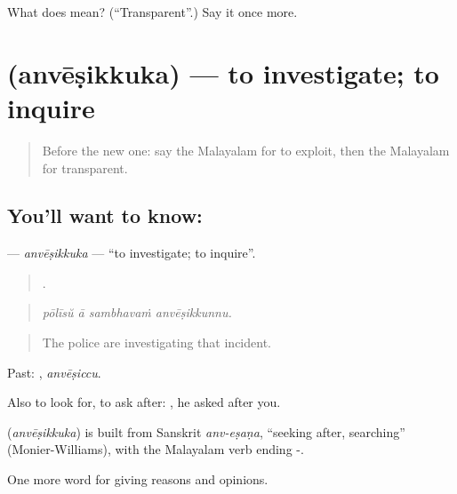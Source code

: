 \begin{tcolorbox}[breakable,colback=teal!4,colframe=teal!35!black,title={Before you move on}]
What does  mean? (\textquotedblleft{}Transparent\textquotedblright{}.) Say it once more.
\end{tcolorbox}
\section[\texorpdfstring{\ml{അന്വേഷിക്കുക} (anvēṣikkuka)}{അന്വേഷിക്കുക (anvēṣikkuka)}]{ (anvēṣikkuka) — to investigate; to inquire}

\label{lesson:ML-C430-anvesikkuka}



\begin{quote}
Before the new one: say the Malayalam for to exploit, then the Malayalam for transparent.
\end{quote}

\subsection*{You'll want to know: }
\textbf{} — \emph{anvēṣikkuka} — \textquotedblleft{}to investigate; to inquire\textquotedblright{}.

\begin{quote}
   .
\end{quote}

\begin{quote}
\emph{pōlīsŭ ā sambhavaṁ anvēṣikkunnu.}
\end{quote}

\begin{quote}
The police are investigating that incident.
\end{quote}

Past: , \emph{anvēṣiccu}.

Also to look for, to ask after:   , he asked after you.

\begin{cousinweb}
\textbf{} (\emph{anvēṣikkuka}) is built from Sanskrit \emph{anv-eṣaṇa}, \textquotedblleft{}seeking after, searching\textquotedblright{} (Monier-Williams), with the Malayalam verb ending -.
\end{cousinweb}

\begin{grammarlens}[title={What you've built}]
One more word for giving reasons and opinions.
\end{grammarlens}

